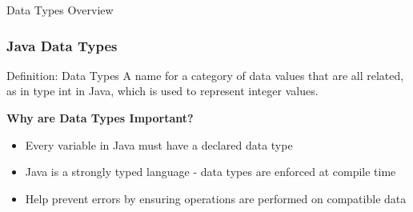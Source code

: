 \documentclass[aspectratio=169]{beamer}
\begin{document}
\begin{frame}{Data Types Overview}
    \frametitle{Java Data Types}
    
    \begin{block}{Definition: Data Types}
        A name for a category of data values that are all related, as in type int in Java, which is used to represent integer values.
    \end{block}
    
    \vspace{0.5em}
    
    \textbf{Why are Data Types Important?}
    \begin{itemize}
        \item Every variable in Java must have a declared data type
        \item Java is a strongly typed language - data types are enforced at compile time
        \item Help prevent errors by ensuring operations are performed on compatible data
    \end{itemize}
    
    
\end{frame}
\end{document}
